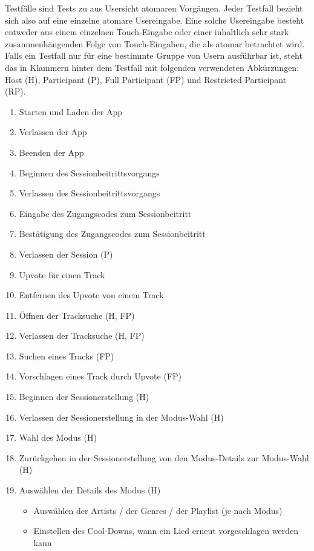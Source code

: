 \documentclass[oneside, ngerman]{sdqtechreport}
\begin{document}
Testfälle sind Tests zu aus Usersicht atomaren Vorgängen. Jeder Testfall bezieht sich also auf eine einzelne atomare Usereingabe. Eine solche Usereingabe besteht entweder aus einem einzelnen Touch-Eingabe oder einer inhaltlich sehr stark zusammenhängenden Folge von Touch-Eingaben, die als atomar betrachtet wird. Falls ein Testfall nur für eine bestimmte Gruppe von Usern ausführbar ist, steht das in Klammern hinter dem Testfall mit folgenden verwendeten Abkürzungen: Host (H), Participant (P), Full Participant (FP) und Restricted Participant (RP).

\begin{enumerate}
    \item Starten und Laden der App
    \item Verlassen der App
    \item Beenden der App
    \item Beginnen des Sessionbeitrittsvorgangs
    \item Verlassen des Sessionbeitrittsvorgangs
    \item Eingabe des Zugangscodes zum Sessionbeitritt
    \item Bestätigung des Zugangscodes zum Sessionbeitritt
    \item Verlassen der Session (P)
    \item Upvote für einen Track
    \item Entfernen des Upvote von einem Track
    \item Öffnen der Tracksuche (H, FP)
    \item Verlassen der Tracksuche (H, FP)
    \item Suchen eines Tracks (FP)
    \item Vorschlagen eines Track durch Upvote (FP)
    \item Beginnen der Sessionerstellung (H)
    \item Verlassen der Sessionerstellung in der Modus-Wahl (H)
    \item Wahl des Modus (H)
    \item Zurückgehen in der Sessionerstellung von den Modus-Details zur Modus-Wahl (H)
    \item Auswählen der Details des Modus (H)
    \begin{itemize}
        \item Auswählen der Artists / der Genres / der Playlist (je nach Modus)
        \item Einstellen des Cool-Downs, wann ein Lied erneut vorgeschlagen werden kann
    \end{itemize}

\end{enumerate}
\end{document}
